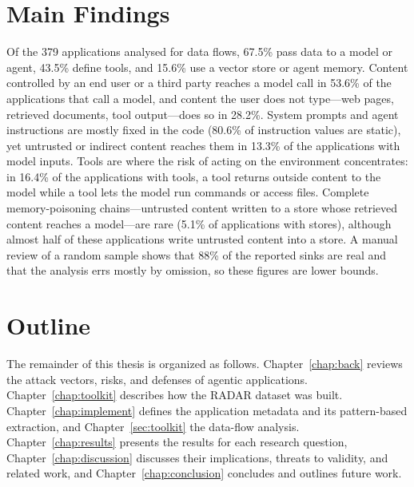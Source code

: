 \section*{Main Findings}

Of the 379 applications analysed for data flows, 67.5\% pass data to a model or agent, 43.5\% define tools, and 15.6\% use a vector store or agent memory. Content controlled by an end user or a third party reaches a model call in 53.6\% of the applications that call a model, and content the user does not type---web pages, retrieved documents, tool output---does so in 28.2\%. System prompts and agent instructions are mostly fixed in the code (80.6\% of instruction values are static), yet untrusted or indirect content reaches them in 13.3\% of the applications with model inputs. Tools are where the risk of acting on the environment concentrates: in 16.4\% of the applications with tools, a tool returns outside content to the model while a tool lets the model run commands or access files. Complete memory-poisoning chains---untrusted content written to a store whose retrieved content reaches a model---are rare (5.1\% of applications with stores), although almost half of these applications write untrusted content into a store. A manual review of a random sample shows that 88\% of the reported sinks are real and that the analysis errs mostly by omission, so these figures are lower bounds.

\section*{Outline}

The remainder of this thesis is organized as follows. Chapter~\ref{chap:back} reviews the attack vectors, risks, and defenses of agentic applications. Chapter~\ref{chap:toolkit} describes how the RADAR dataset was built. Chapter~\ref{chap:implement} defines the application metadata and its pattern-based extraction, and Chapter~\ref{sec:toolkit} the data-flow analysis. Chapter~\ref{chap:results} presents the results for each research question, Chapter~\ref{chap:discussion} discusses their implications, threats to validity, and related work, and Chapter~\ref{chap:conclusion} concludes and outlines future work.